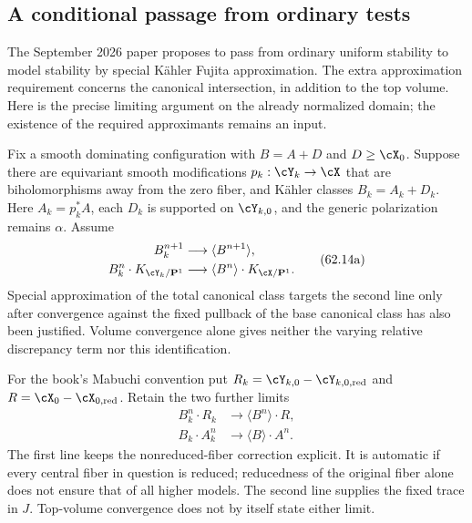 \subsection{A conditional passage from ordinary tests}
\label{subsec:mpwn-special-kahler-passage}

The September 2026 paper \cite{Trusiani26TranscendentalV1}
proposes to pass from ordinary uniform stability to model stability
by special K\"ahler Fujita approximation. The extra approximation
requirement concerns the canonical intersection, in addition to
the top volume. Here is the precise limiting argument on the
already normalized domain; the existence of the required
approximants remains an input.

Fix a smooth dominating configuration with $B=A+D$ and
$D\geq\cX_0$. Suppose there are equivariant smooth modifications
$p_k:\cY_k\to\cX$ that are biholomorphisms away from the zero
fiber, and K\"ahler classes $B_k=A_k+D_k$. Here $A_k=p_k^*A$,
each $D_k$ is supported on $\cY_{k,0}$, and the generic
polarization remains $\alpha$. Assume
\[
 \begin{aligned}
 B_k^{n+1}&\longrightarrow\langle B^{n+1}\rangle,\\
 B_k^n\cdot K_{\cY_k/\mathbf P^1}
   &\longrightarrow\langle B^n\rangle\cdot
                              K_{\cX/\mathbf P^1}.
 \end{aligned}
 \tag{62.14a}\label{eq:mpwn-special-volume-canonical-limits}
\]
Special approximation of the total canonical class targets the
second line only after convergence against the fixed pullback of
the base canonical class has also been justified. Volume convergence
alone gives neither the varying relative discrepancy term nor this
identification.

For the book's Mabuchi convention put
$R_k=\cY_{k,0}-\cY_{k,0,\mathrm{red}}$ and
$R=\cX_0-\cX_{0,\mathrm{red}}$. Retain the two further limits
\[
 \begin{aligned}
 B_k^n\cdot R_k&\longrightarrow\langle B^n\rangle\cdot R,\\
 B_k\cdot A_k^n&\longrightarrow\langle B\rangle\cdot A^n.
 \end{aligned}
 \tag{62.14b}\label{eq:mpwn-special-reduction-j-limits}
\]
The first line keeps the nonreduced-fiber correction explicit.
It is automatic if every central fiber in question is reduced;
reducedness of the original fiber alone does not ensure that of
all higher models. The second line supplies the fixed trace in $J$.
Top-volume convergence does not by itself state either limit.

